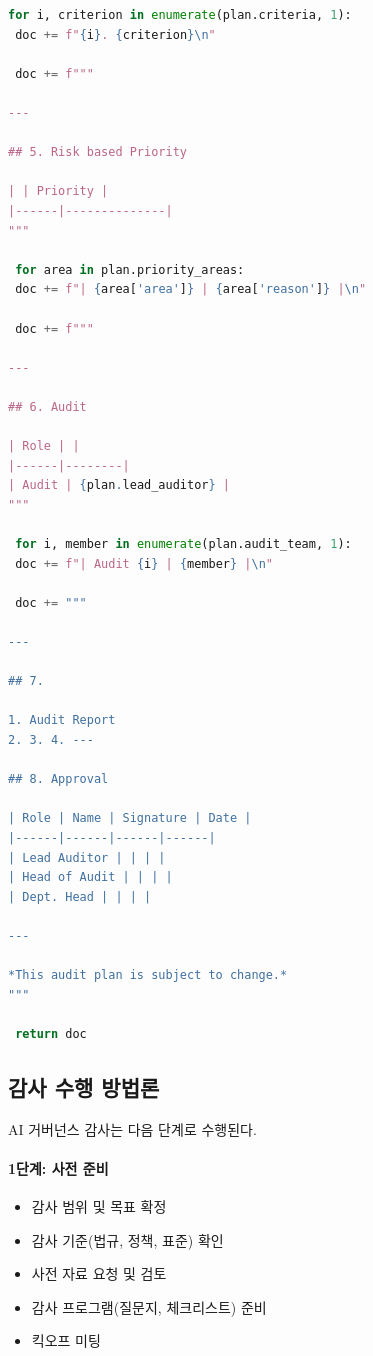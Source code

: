 \begin{lstlisting}[language=Python, caption={AI Governance Audit Plan Generator}, label={lst:audit_plan_generator}]
 for i, criterion in enumerate(plan.criteria, 1):
 doc += f"{i}. {criterion}\n"
 
 doc += f"""

---

## 5. Risk based Priority

| | Priority |
|------|--------------|
"""
 
 for area in plan.priority_areas:
 doc += f"| {area['area']} | {area['reason']} |\n"
 
 doc += f"""

---

## 6. Audit 

| Role | |
|------|--------|
| Audit | {plan.lead_auditor} |
"""
 
 for i, member in enumerate(plan.audit_team, 1):
 doc += f"| Audit {i} | {member} |\n"
 
 doc += """

---

## 7. 

1. Audit Report
2. 3. 4. ---

## 8. Approval

| Role | Name | Signature | Date |
|------|------|------|------|
| Lead Auditor | | | |
| Head of Audit | | | |
| Dept. Head | | | |

---

*This audit plan is subject to change.*
"""
 
 return doc
\end{lstlisting}


\subsection{감사 수행 방법론}
\label{sec:11.2.2}

AI 거버넌스 감사는 다음 단계로 수행된다.

\paragraph{1단계: 사전 준비}

\begin{itemize}
 \item 감사 범위 및 목표 확정
 \item 감사 기준(법규, 정책, 표준) 확인
 \item 사전 자료 요청 및 검토
 \item 감사 프로그램(질문지, 체크리스트) 준비
 \item 킥오프 미팅
\end{itemize}

